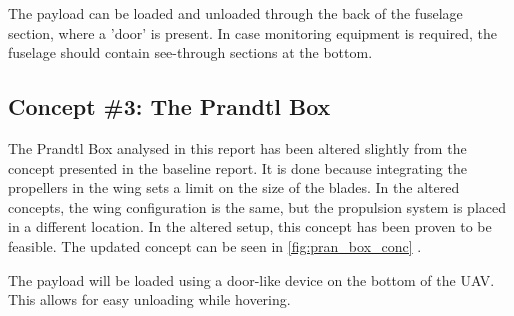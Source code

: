The payload can be loaded and unloaded through the back of the fuselage section, where a 'door' is present. In case monitoring equipment is required, the fuselage should contain see-through sections at the bottom. 


\subsection{Concept \#3: The Prandtl Box}
The Prandtl Box analysed in this report has been altered slightly from the concept presented in the baseline report\cite{baseline}. It is done because integrating the propellers in the wing sets a limit on the size of the blades. In the altered concepts, the wing configuration is the same, but the propulsion system is placed in a different location. In the altered setup, this concept has been proven to be feasible\footnotemark. The updated concept can be seen in \autoref{fig:pran_box_conc}
.

The payload will be loaded using a door-like device on the bottom of the UAV. This allows for easy unloading while hovering.

